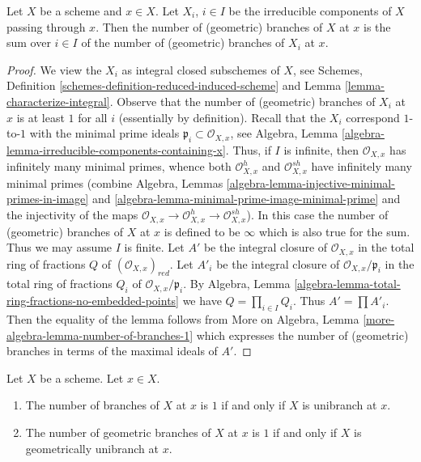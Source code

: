 \begin{lemma}
\label{lemma-number-of-branches-irreducible-components}
Let $X$ be a scheme and $x \in X$. Let $X_i$, $i \in I$ be the
irreducible components of $X$ passing through $x$.
Then the number of (geometric) branches of $X$ at $x$
is the sum over $i \in I$ of the number of (geometric)
branches of $X_i$ at $x$.
\end{lemma}

\begin{proof}
We view the $X_i$ as integral closed subschemes of $X$, see
Schemes, Definition \ref{schemes-definition-reduced-induced-scheme} and
Lemma \ref{lemma-characterize-integral}.
Observe that the number of (geometric) branches of $X_i$ at $x$
is at least $1$ for all $i$ (essentially by definition).
Recall that the $X_i$ correspond $1$-to-$1$ with the minimal
prime ideals $\mathfrak p_i \subset \mathcal{O}_{X, x}$, see
Algebra, Lemma \ref{algebra-lemma-irreducible-components-containing-x}.
Thus, if $I$ is infinite, then $\mathcal{O}_{X, x}$ has infinitely
many minimal primes, whence both $\mathcal{O}_{X, x}^h$
and $\mathcal{O}_{X, x}^{sh}$ have infinitely many minimal
primes (combine Algebra, Lemmas
\ref{algebra-lemma-injective-minimal-primes-in-image} and
\ref{algebra-lemma-minimal-prime-image-minimal-prime} and
the injectivity of the maps
$\mathcal{O}_{X, x} \to  \mathcal{O}_{X, x}^h \to \mathcal{O}_{X, x}^{sh}$).
In this case the number of (geometric) branches of $X$ at $x$
is defined to be $\infty$ which is also true for the sum.
Thus we may assume $I$ is finite.
Let $A'$ be the integral closure of $\mathcal{O}_{X, x}$
in the total ring of fractions $Q$ of $(\mathcal{O}_{X, x})_{red}$.
Let $A'_i$ be the  integral closure of $\mathcal{O}_{X, x}/\mathfrak p_i$
in the total ring of fractions $Q_i$ of $\mathcal{O}_{X, x}/\mathfrak p_i$.
By Algebra, Lemma \ref{algebra-lemma-total-ring-fractions-no-embedded-points}
we have $Q = \prod_{i \in I} Q_i$. Thus $A' = \prod A'_i$.
Then the equality of the lemma follows from
More on Algebra, Lemma \ref{more-algebra-lemma-number-of-branches-1}
which expresses the number of (geometric) branches in terms
of the maximal ideals of $A'$.
\end{proof}

\begin{lemma}
\label{lemma-number-of-branches-1}
Let $X$ be a scheme. Let $x \in X$.
\begin{enumerate}
\item The number of branches of $X$ at $x$ is $1$ if and only if
$X$ is unibranch at $x$.
\item The number of geometric branches of $X$ at $x$ is $1$ if and only if
$X$ is geometrically unibranch at $x$.
\end{enumerate}
\end{lemma}

